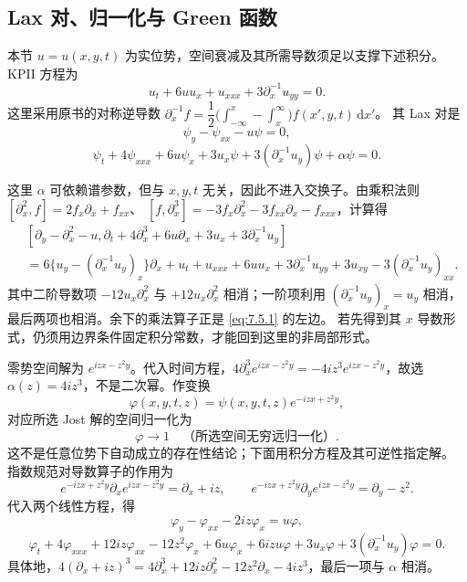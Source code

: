 \documentclass[lang=cn,scheme=chinese,mode=simple,device=normal,color=blue,math=cm,thmcnt=section,12pt]{elegantbook}
\newcommand{\dd}{\,\mathrm{d}}
\newcommand{\eqq}[2]{\tag{#1}\label{eq:#1}#2}
\begin{document}
\subsection{Lax 对、归一化与 Green 函数}
本节 $u=u(x,y,t)$ 为实位势，空间衰减及其所需导数须足以支撑下述积分。KPII 方程为
\begin{equation}
\eqq{7.5.1}{u_t+6uu_x+u_{xxx}+3\partial_x^{-1}u_{yy}=0.}
\end{equation}
这里采用原书的对称逆导数
$\partial_x^{-1}f=\dfrac{1}{2}\bigl(\displaystyle\int_{-\infty}^x-\displaystyle\int_x^\infty\bigr)f(x',y,t)\dd x'$。
其 Lax 对是
\begin{equation}
\eqq{7.5.2}{\psi_y-\psi_{xx}-u\psi=0,}
\end{equation}
\begin{equation}
\eqq{7.5.3}{\psi_t+4\psi_{xxx}+6u\psi_x+3u_x\psi+3(\partial_x^{-1}u_y)\psi+\alpha\psi=0.}
\end{equation}
\begin{callout}
这里 $\alpha$ 可依赖谱参数，但与 $x,y,t$ 无关，因此不进入交换子。由乘积法则
$[\partial_x^2,f]=2f_x\partial_x+f_{xx}$、
$[f,\partial_x^3]=-3f_x\partial_x^2-3f_{xx}\partial_x-f_{xxx}$，计算得
\[
\begin{aligned}
&[\partial_y-\partial_x^2-u,\partial_t+4\partial_x^3+6u\partial_x+3u_x+3\partial_x^{-1}u_y]\\
&=6\{u_y-(\partial_x^{-1}u_y)_x\}\partial_x
+u_t+u_{xxx}+6uu_x+3\partial_x^{-1}u_{yy}
+3u_{xy}-3(\partial_x^{-1}u_y)_{xx}.
\end{aligned}
\]
其中二阶导数项 $-12u_x\partial_x^2$ 与 $+12u_x\partial_x^2$ 相消；一阶项利用
$(\partial_x^{-1}u_y)_x=u_y$ 相消，最后两项也相消。余下的乘法算子正是 \eqref{eq:7.5.1} 的左边。
若先得到其 $x$ 导数形式，仍须用边界条件固定积分常数，才能回到这里的非局部形式。
\end{callout}
零势空间解为 $e^{izx-z^2y}$。代入时间方程，$4\partial_x^3e^{izx-z^2y}=-4iz^3e^{izx-z^2y}$，故选 $\alpha(z)=4iz^3$，不是二次幂。作变换
\begin{equation}
\eqq{7.5.4}{\varphi(x,y,t,z)=\psi(x,y,t,z)e^{-izx+z^2y},}
\end{equation}
对应所选 Jost 解的空间归一化为
\begin{equation}
\eqq{7.5.5}{\varphi\to1\quad\text{（所选空间无穷远归一化）}.}
\end{equation}
这不是任意位势下自动成立的存在性结论；下面用积分方程及其可逆性指定解。
指数规范对导数算子的作用为
\[
e^{-izx+z^2y}\partial_xe^{izx-z^2y}=\partial_x+iz,\qquad
e^{-izx+z^2y}\partial_ye^{izx-z^2y}=\partial_y-z^2.
\]
代入两个线性方程，得
\begin{equation}
\eqq{7.5.6}{\varphi_y-\varphi_{xx}-2iz\varphi_x=u\varphi,}
\end{equation}
\begin{equation}
\eqq{7.5.7}{\varphi_t+4\varphi_{xxx}+12iz\varphi_{xx}-12z^2\varphi_x
+6u\varphi_x+6izu\varphi+3u_x\varphi+3(\partial_x^{-1}u_y)\varphi=0.}
\end{equation}
具体地，$4(\partial_x+iz)^3=4\partial_x^3+12iz\partial_x^2-12z^2\partial_x-4iz^3$，最后一项与 $\alpha$ 相消。
\end{document}
